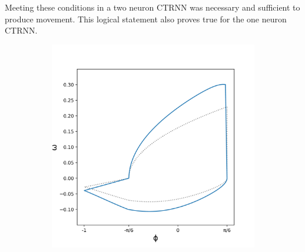 \documentclass{article}
\begin{document}
Meeting these conditions in a two neuron CTRNN was necessary and sufficient to produce movement. This logical statement also proves true for the one neuron CTRNN.

\begin{figure}[htbp]
  \centering
  \begin{subfigure}[b]{0.5\textwidth}
    \vspace{0pt} %
    \centering
    \includegraphics[width=\textwidth]{../plots/trajectory2_224_18.png}
    \caption{}
    \label{fig:DuckPlot2Best}
  \end{subfigure}%
  \hspace{-15pt}%
  \begin{subfigure}[b]{0.5\textwidth}
    \vspace{0pt} %
    \centering

\end{subfigure}
\end{figure}
\end{document}
